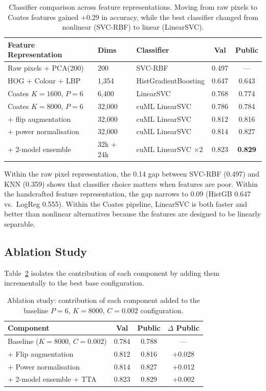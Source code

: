 \documentclass[11pt,a4paper]{article}
\begin{document}
\begin{table}[H]
\centering
\caption{Classifier comparison across feature representations.  Moving from raw
pixels to Coates features gained +0.29 in accuracy, while the best classifier
changed from nonlinear (SVC-RBF) to linear (LinearSVC).}
\label{tab:classifier_comparison}
\begin{tabular}{@{}p{4.2cm}p{2.4cm}lcc@{}}
\toprule
Feature Representation & Dims & Classifier & Val & Public \\
\midrule
Raw pixels + PCA(200) & 200 & SVC-RBF & 0.497 & --- \\
HOG + Colour + LBP & 1,354 & HistGradientBoosting & 0.647 & 0.643 \\
Coates $K\!=\!1600$, $P\!=\!6$ & 6,400 & LinearSVC & 0.768 & 0.774 \\
Coates $K\!=\!8000$, $P\!=\!6$ & 32,000 & cuML LinearSVC & 0.786 & 0.784 \\
\quad + flip augmentation & 32,000 & cuML LinearSVC & 0.812 & 0.816 \\
\quad + power normalisation & 32,000 & cuML LinearSVC & 0.814 & 0.827 \\
\quad + 2-model ensemble & 32k + 24k & cuML LinearSVC $\times 2$ & 0.823 & \textbf{0.829} \\
\bottomrule
\end{tabular}
\end{table}

Within the raw pixel representation, the 0.14 gap between SVC-RBF (0.497) and
KNN (0.359) shows that classifier choice matters when features are poor.
Within the handcrafted feature representation, the gap narrows to 0.09 (HistGB
0.647 vs.\ LogReg 0.555).  Within the Coates pipeline, LinearSVC is both
faster and better than nonlinear alternatives because the features are designed
to be linearly separable.

\subsection{Ablation Study}
\label{sec:ablation}

Table~\ref{tab:ablation} isolates the contribution of each component by adding
them incrementally to the best base configuration.

\begin{table}[H]
\centering
\caption{Ablation study: contribution of each component added to the baseline
$P\!=\!6$, $K\!=\!8000$, $C\!=\!0.002$ configuration.}
\label{tab:ablation}
\begin{tabular}{@{}lccc@{}}
\toprule
Component & Val & Public & $\Delta$ Public \\
\midrule
Baseline ($K\!=\!8000$, $C\!=\!0.002$) & 0.784 & 0.788 & --- \\
+ Flip augmentation & 0.812 & 0.816 & +0.028 \\
+ Power normalisation & 0.814 & 0.827 & +0.012 \\
+ 2-model ensemble + TTA & 0.823 & 0.829 & +0.002 \\
\bottomrule
\end{tabular}
\end{table}
\end{document}
